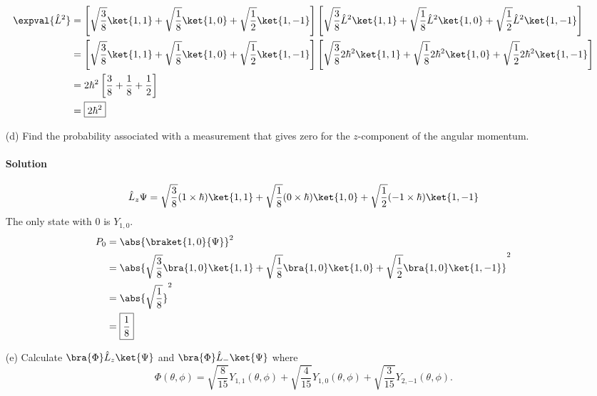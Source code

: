 \documentclass{article}
\begin{document}
\begin{enumerate}
		\begin{equation}
			\begin{aligned}[b]
				\expval{\hat{L}^2} &= \left[ \sqrt{\frac{3}{8}} \ket{1,1} + \sqrt{\frac{1}{8}} \ket{1,0} + \sqrt{\frac{1}{2}} \ket{1,-1} \right] \left[ \sqrt{\frac{3}{8}} \hat{L}^2 \ket{1,1} + \sqrt{\frac{1}{8}} \hat{L}^2 \ket{1,0} + \sqrt{\frac{1}{2}} \hat{L}^2 \ket{1,-1} \right] \\
								   &= \left[ \sqrt{\frac{3}{8}} \ket{1,1} + \sqrt{\frac{1}{8}} \ket{1,0} + \sqrt{\frac{1}{2}} \ket{1,-1} \right] \left[ \sqrt{\frac{3}{8}} 2\hbar^2 \ket{1,1} + \sqrt{\frac{1}{8}} 2\hbar^2 \ket{1,0} + \sqrt{\frac{1}{2}} 2\hbar^2 \ket{1,-1} \right] \\
								   &= 2\hbar^2 \left[ \frac{3}{8} + \frac{1}{8} + \frac{1}{2} \right] \\
								   &= \boxed{2\hbar^2} 
			\end{aligned}
		\end{equation}
		
		\item[(d)] Find the probability associated with a measurement that gives zero for the $z$-component of the angular momentum.
		\paragraph{Solution}
		
		\begin{equation}
			\begin{aligned}[b]
				\hat{L}_z \Psi = \sqrt{\frac{3}{8}} (1 \times \hbar) \ket{1,1} + \sqrt{\frac{1}{8}} (0 \times \hbar) \ket{1,0} + \sqrt{\frac{1}{2}} (-1 \times \hbar) \ket{1,-1}
			\end{aligned}
		\end{equation}
		The only state with $0$ is $Y_{1,0}$.
		\begin{equation}
			\begin{aligned}[b]
				P_0 &= \abs{ \braket{1,0}{\Psi} }^2 \\
					&= \abs{ \sqrt{\frac{3}{8}} \bra{1,0}\ket{1,1} + \sqrt{\frac{1}{8}} \bra{1,0}\ket{1,0} + \sqrt{\frac{1}{2}} \bra{1,0}\ket{1,-1} }^2 \\
					&= \abs{ \sqrt{\frac{1}{8}} }^2 \\
					&= \boxed{\frac{1}{8}}
			\end{aligned}
		\end{equation}
		
		\item[(e)] Calculate $\bra{\Phi}\hat{L}_z \ket{\Psi}$ and $\bra{\Phi}\hat{L}_- \ket{\Psi}$ where
		\begin{equation} \label{eq:3}
			\Phi(\theta, \phi) = \sqrt{\frac{8}{15}} Y_{1,1}(\theta, \phi) + \sqrt{\frac{4}{15}} Y_{1,0}(\theta, \phi) + \sqrt{\frac{3}{15}} Y_{2,-1}(\theta, \phi). 
		\end{equation}

\end{enumerate}
\end{document}
